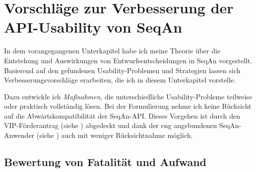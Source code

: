 \section[API-Usability-Verbesserungsvorschläge]{Vorschläge zur Verbesserung der API-Usability von SeqAn}
\label{sec:seqan-api-usability-vorschlaege}

In dem vorangegangenen Unterkapitel habe ich meine Theorie über die Entstehung und Auswirkungen von Entwurfsentscheidungen in SeqAn vorgestellt. Basierend auf den gefundenen Usability-Problemen und Strategien lassen sich Verbesserungsvorschläge erarbeiten, die ich in diesem Unterkapitel vorstelle. 

Dazu entwickle ich \textit{Maßnahmen}, die unterschiedliche Usability-Probleme teilweise oder praktisch vollständig lösen. Bei der Formulierung nehme ich keine Rücksicht auf die Abwärtskompatibilität der SeqAn-API. Dieses Vorgehen ist durch den VIP-Förderantrag (siehe ) abgedeckt und dank der eng angebundenen SeqAn-Anwender (siehe ) auch mit weniger Rücksichtnahme möglich.


\subsection{Bewertung von Fatalität und Aufwand}


